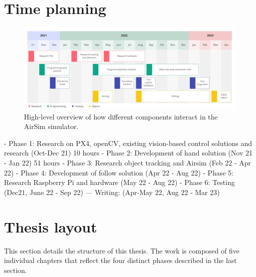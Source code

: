 \section{Time planning}
\label{sec:time-planning}


\begin{figure}
  \centering
  \includegraphics[width=\textwidth,keepaspectratio]{img/project-timeline.jpg}
  \caption{High-level overview of how different components interact in the AirSim simulator.}
  \label{fig:project-timeline}
\end{figure}


- Phase 1: Research on PX4, openCV, existing vision-based control solutions and research (Oct-Dec 21) 10 hours
- Phase 2: Development of hand solution (Nov 21 - Jan 22) 51 hours
- Phase 3: Research object tracking and Airsim (Feb 22 - Apr 22)
- Phase 4: Development of follow solution (Apr 22 - Aug 22)
- Phase 5: Research Raspberry Pi and hardware (May 22 - Aug 22)
- Phase 6: Testing (Dec21, June 22 - Sep 22)
--- Writing: (Apr-May 22, Aug 22 - Mar 23)

\section{Thesis layout}
\label{sec:layout}

This section details the structure of this thesis.
The work is composed of five individual chapters that reflect the four distinct phases described in the last section.

